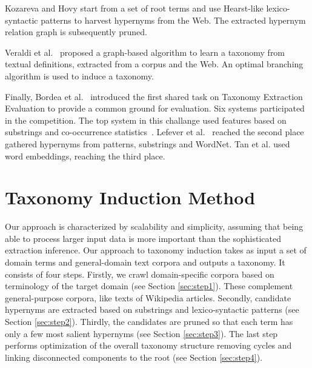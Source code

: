 \documentclass[11pt,letterpaper]{article}
\begin{document}
Kozareva and Hovy  start from a set of root terms and use Hearst-like lexico-syntactic patterns to harvest hypernyms from the Web. The extracted hypernym relation graph is subsequently pruned.  



Veraldi et al.~ proposed a graph-based algorithm to learn a taxonomy from textual definitions, extracted from a corpus and the Web. An optimal branching algorithm is used to induce a taxonomy. 

Finally, Bordea et al.~ introduced the first shared task on Taxonomy Extraction Evaluation to provide a common ground for evaluation. Six systems participated in the competition. The top system in this challange used features based on substrings and co-occurrence statistics~\cite{grefenstette2015inriasac}. Lefever et al.~ reached the second place gathered hypernyms from patterns, substrings and WordNet. Tan et al.  used word embeddings, reaching the third place.


\section{Taxonomy Induction Method}

Our approach is characterized by scalability and simplicity, assuming that being able to process larger input data is more important than the sophisticated extraction inference. Our approach to taxonomy induction takes as input a set of domain terms and general-domain text corpora and outputs a taxonomy. It consists of four steps. Firstly, we crawl domain-specific corpora based on terminology of the target domain (see Section \ref{sec:step1}). These complement general-purpose corpora, like texts of Wikipedia articles. Secondly, candidate hypernyms are extracted based on substrings and lexico-syntactic patterns (see Section \ref{sec:step2}). Thirdly, the candidates are pruned so that each term has only a few most salient hypernyms (see Section \ref{sec:step3}). The last step performs optimization of the overall taxonomy structure removing cycles and linking disconnected components to the root (see Section \ref{sec:step4}).  
\end{document}
